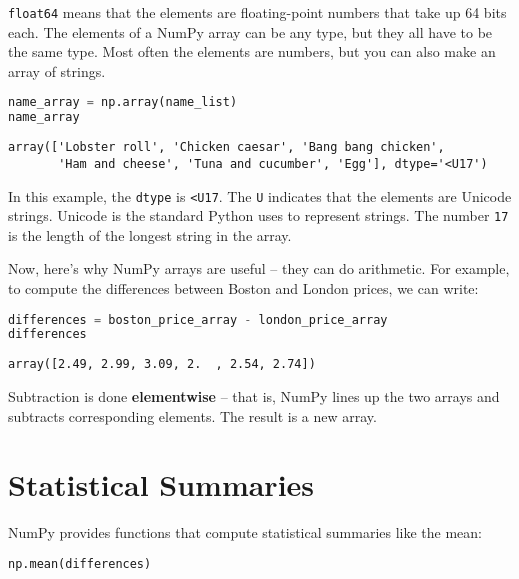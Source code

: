 \passthrough{\lstinline!float64!} means that the elements are
floating-point numbers that take up 64 bits each. The elements of a
NumPy array can be any type, but they all have to be the same type. Most
often the elements are numbers, but you can also make an array of
strings.

\begin{lstlisting}[language=Python,style=source]
name_array = np.array(name_list)
name_array
\end{lstlisting}

\begin{lstlisting}[style=output]
array(['Lobster roll', 'Chicken caesar', 'Bang bang chicken',
       'Ham and cheese', 'Tuna and cucumber', 'Egg'], dtype='<U17')
\end{lstlisting}

In this example, the \passthrough{\lstinline!dtype!} is
\passthrough{\lstinline!<U17!}. The \passthrough{\lstinline!U!}
indicates that the elements are Unicode strings. Unicode is the standard
Python uses to represent strings. The number
\passthrough{\lstinline!17!} is the length of the longest string in the
array.

Now, here's why NumPy arrays are useful -- they can do arithmetic. For
example, to compute the differences between Boston and London prices, we
can write:

\begin{lstlisting}[language=Python,style=source]
differences = boston_price_array - london_price_array
differences
\end{lstlisting}

\begin{lstlisting}[style=output]
array([2.49, 2.99, 3.09, 2.  , 2.54, 2.74])
\end{lstlisting}

Subtraction is done \textbf{elementwise} -- that is, NumPy lines up the
two arrays and subtracts corresponding elements. The result is a new
array.

\hypertarget{statistical-summaries}{%
\section{Statistical Summaries}\label{statistical-summaries}}

NumPy provides functions that compute statistical summaries like the
mean:

\begin{lstlisting}[language=Python,style=source]
np.mean(differences)
\end{lstlisting}

